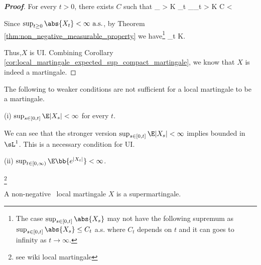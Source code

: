 \begin{proof}[\bf Proof]
For every $t>0$, there exists $C$ such that %
\be
{} \ind_{ > K} \leq \sup_{t}  \ind_{\sup_{t}  > K} \leq C < \infty \quad {}%
\ee

Since $\sup_{t\geq 0} \abs{X_t} < \infty \text{ a.s.}$, by Theorem \ref{thm:non_negative_measurable_property} we have\footnote{The case $\sup_{s\in [0,t]} \abs{X_s}$ may not have the following
supremum as $\sup_{s\in [0,t]} \abs{X_s} \leq C_t$ a.s. where $C_t$ depends on $t$ and it can goes to infinity as $t\to\infty$.}
\be
\sup_{t}\E{} \leq \E{}  \quad  {}K\to \infty.
\ee

Thus,$X$ is UI. Combining Corollary \ref{cor:local_martingale_expected_sup_compact_martingale}, we know that $X$ is indeed a martingale.%
\end{proof}



\begin{remark}
The following to weaker conditions are not sufficient for a local martingale to be a martingale.
\ben
\item [(i)] $\sup_{s\in[0,t]} \E |X_s| < \infty$ for every $t$.

We can see that the stronger version $\sup_{s\in[0,t]} \E |X_s| < \infty$ implies bounded in $\sL^1$. This is a necessary condition for UI.

\item [(ii)] $\sup_{t\in[0,\infty)} \E \bb{e^{|X_t|}} < \infty$.
\een
\end{remark}

\begin{example}
\footnote{see wiki local martingale}
\end{example}


\begin{theorem}
A non-negative \cadlag\ local martingale $X$ is a supermartingale.
\end{theorem}


